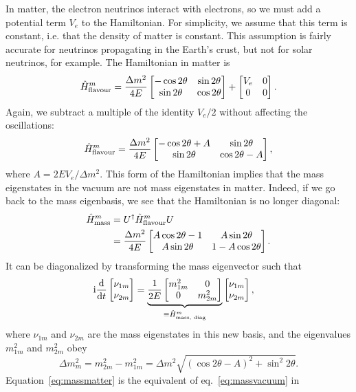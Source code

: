 In matter, the electron neutrinos interact with electrons, so we must add a
potential term $V_e$ to the Hamiltonian. For simplicity, we assume that this
term is constant, i.e. that the density of matter is constant. This assumption
is fairly accurate for neutrinos propagating in the Earth's crust, but not for
solar neutrinos, for example. The Hamiltonian in matter is
\begin{equation}
	\hat{H}^m_\text{flavour} = \frac{\Delta m^2}{4 E} \begin{bmatrix}-\cos 2\theta & \sin
	2\theta \\ \sin 2\theta & \cos 2\theta\end{bmatrix} + \begin{bmatrix}V_e & 0 \\ 0 &
	0\end{bmatrix}.\label{eq:matter_potential}
\end{equation}
Again, we subtract a multiple of the identity $V_e / 2$ without affecting the
oscillations:
\begin{equation}\hat{H}^m_\text{flavour} = \frac{\Delta m^2}{4 E} \begin{bmatrix}-\cos 2\theta + A & \sin
2\theta \\ \sin 2\theta & \cos 2\theta - A\end{bmatrix},\label{eq:flavourmatter1}\end{equation}
where $A = 2 E V_e / \Delta m^2$.
This form of the Hamiltonian implies that the mass eigenstates in the vacuum
are not mass eigenstates in matter. Indeed, if we go back to the mass
eigenbasis, we see that the Hamiltonian is no longer diagonal:
\begin{align*}
	\hat{H}^m_\text{mass} &= U^\dagger \hat{H}^m_\text{flavour} U\\
	&= \frac{\Delta m^2}{4E} \begin{bmatrix}A \cos 2\theta - 1 & A \sin 2\theta \\ A \sin
	2\theta & 1 - A\cos 2\theta\end{bmatrix}.
\end{align*}
It can be diagonalized by transforming the mass eigenvector such that
\begin{align}\mathrm{i} \frac{\mathrm{d}}{\mathrm{d} t} \begin{bmatrix}\nu_{1m} \\ \nu_{2m}\end{bmatrix} &= \underbrace{\frac{1}{2E}
\begin{bmatrix}m^2_{1m} & 0 \\ 0 & m^2_{2m}\end{bmatrix}}_{\equiv \hat{H}^m_\text{mass, diag}}
\begin{bmatrix}\nu_{1m} \\ \nu_{2m}\end{bmatrix},\label{eq:massmatter}\end{align}
where $\nu_{1m}$ and $\nu_{2m}$ are the mass eigenstates in this new basis, and
the eigenvalues $m^2_{1m}$ and $m^2_{2m}$ obey
\begin{equation}\Delta m^2_m = m^2_{2m} - m^2_{1m} = \Delta m^2 \sqrt{(\cos 2\theta - A)^2 +
\sin^2 2\theta}.\label{eq:deltam2m}\end{equation}
Equation~\ref{eq:massmatter} is the equivalent of eq.~\ref{eq:massvacuum} in
